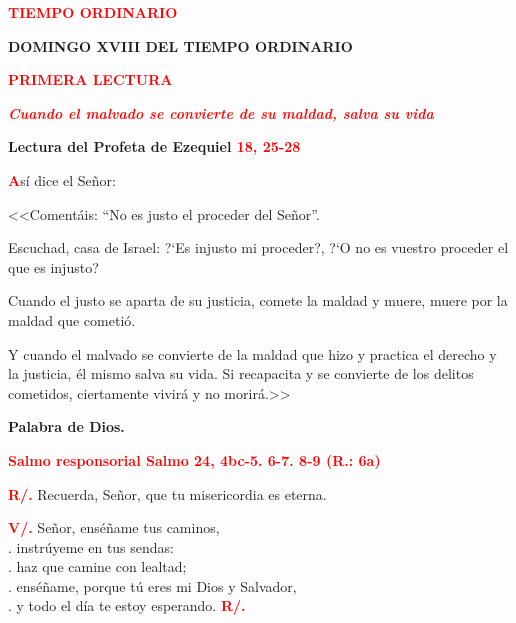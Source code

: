 \documentclass[12pt, letterpaper]{report}
\begin{document}
\begin{center}
\Large {\bfseries \textcolor{red}{TIEMPO ORDINARIO}}
\end{center}

\begin{center}
\Huge {\bfseries DOMINGO XVIII DEL TIEMPO ORDINARIO}
\end{center}

\begin{center}
\Large {\bfseries \textcolor{red}{PRIMERA LECTURA}}
\end{center}

\begin{center}
\large {\bfseries \textit{ \textcolor{red}{Cuando el malvado se convierte de su maldad, salva su vida}}}
\end{center}

\Large {\bfseries Lectura del Profeta de Ezequiel \hspace{1cm} \textcolor{red}{18, 25-28}}

\lettrine[lines=1]{\bfseries \textcolor{red}{A}}{}\Large s\'i dice el Se\~nor:

<<Coment\'ais: ``No es justo el proceder del Se\~nor''.

Escuchad, casa de Israel: ?`Es injusto mi proceder?, ?`O no es vuestro proceder el que es injusto?

Cuando el justo se aparta de su justicia, comete la maldad y muere, muere por la maldad que cometi\'o.

Y cuando el malvado se convierte de la maldad que hizo y practica el derecho y la justicia, \'el mismo salva su vida. Si recapacita y se convierte de los delitos cometidos, ciertamente vivir\'a y no morir\'a.>>

{\bfseries Palabra de Dios.}

\newpage

\Large {\bfseries \textcolor{red}{Salmo responsorial \hspace{1cm} Salmo 24, 4bc-5. 6-7. 8-9 (R.: 6a)}}

\Large {\bfseries \textcolor{red}{R/.}} \hspace{1cm} Recuerda, Se\~nor, que tu misericordia es eterna.

{\bfseries \textcolor{red}{V/.}} \hspace{1cm} Se\~nor, ens\'e\~name tus caminos,\\
. \hspace{2.5cm} instr\'uyeme en tus sendas:\\
. \hspace{2.5cm} haz que camine con lealtad;\\
. \hspace{2.5cm} ens\'e\~name, porque t\'u eres mi Dios y Salvador,\\
. \hspace{2.5cm} y todo el d\'ia te estoy esperando.
\hspace{1cm} {\bfseries \textcolor{red}{R/.}}
\end{document}
